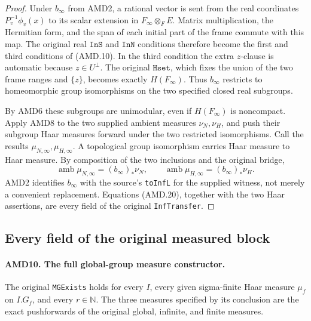 \begin{proof}
Under \(b_\infty\) from AMD2, a rational vector is sent from
the real coordinates \(P_v^{-1}\phi_v(x)\) to its scalar
extension in \(F_\infty\otimes_F E\).  Matrix multiplication,
the Hermitian form, and the span of each initial part of the
frame commute with this map.  The original real \(\texttt{InS}\)
and \(\texttt{InN}\) conditions therefore become the first
and third conditions of (AMD.10).  In the third condition the
extra \(z\)-clause is automatic because \(z\in U^\perp\).
The original \(\texttt{Hset}\), which fixes the union of the
two frame ranges and \(\{z\}\), becomes exactly \(H(F_\infty)\).
Thus \(b_\infty\) restricts to homeomorphic group isomorphisms
on the two specified closed real subgroups.

By AMD6 these subgroups are unimodular, even if \(H(F_\infty)\)
is noncompact.  Apply AMD8 to the two supplied ambient measures
\(\nu_N,\nu_H\), and push their subgroup Haar measures forward
under the two restricted isomorphisms.  Call the results
\(\mu_{N,\infty},\mu_{H,\infty}\).  A topological group
isomorphism carries Haar measure to Haar measure.  By composition
of the two inclusions and the original bridge,
\[
 \operatorname{amb}\mu_{N,\infty}=(b_\infty)_*\nu_N,
 \qquad
 \operatorname{amb}\mu_{H,\infty}=(b_\infty)_*\nu_H.
 \tag{AMD.20}
\]
AMD2 identifies \(b_\infty\) with the source's \texttt{toInfL}
for the supplied witness, not merely a convenient replacement.
Equations (AMD.20), together with the two Haar assertions, are
every field of the original \texttt{InfTransfer}.
\end{proof}

\subsection{Every field of the original measured block}

\paragraph{AMD10. The full global-group measure constructor.}
\label{claim:AMD10}
The original \texttt{MGExists} holds for every \(I\), every
given sigma-finite Haar measure \(\mu_f\) on \(I.G_f\), and
every \(r\in\mathbb N\).  The three measures specified by
its conclusion are the exact pushforwards of the original
global, infinite, and finite measures.

